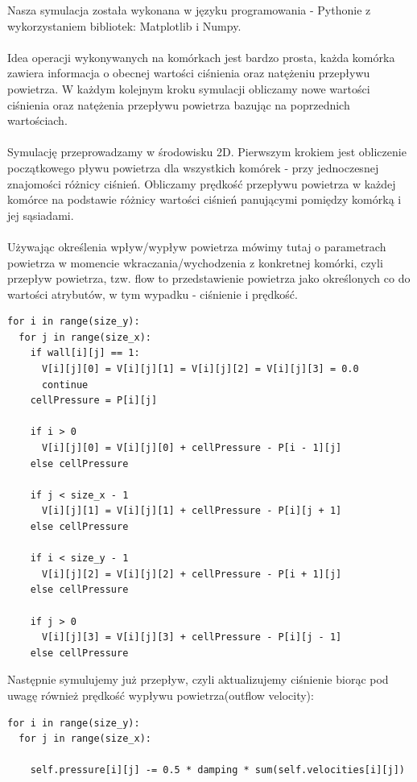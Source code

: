 \documentclass[a4paper, 12pt]{article}
\begin{document}
Nasza symulacja została wykonana w języku programowania - Pythonie z wykorzystaniem bibliotek: Matplotlib i Numpy. 
\\ \\
Idea operacji wykonywanych na komórkach jest bardzo prosta, każda komórka zawiera informacja o obecnej wartości ciśnienia oraz natężeniu przepływu powietrza. W każdym kolejnym kroku symulacji obliczamy nowe wartości ciśnienia oraz natężenia przepływu powietrza bazując na poprzednich wartościach.
\\ \\
Symulację przeprowadzamy w środowisku 2D. Pierwszym krokiem jest obliczenie początkowego pływu powietrza dla wszystkich komórek - przy jednoczesnej znajomości różnicy ciśnień. Obliczamy prędkość przepływu powietrza w każdej komórce na podstawie różnicy wartości ciśnień panującymi pomiędzy komórką i jej sąsiadami.
\\ \\
Używając określenia wpływ/wypływ powietrza mówimy tutaj o parametrach powietrza w momencie wkraczania/wychodzenia z konkretnej komórki, czyli przepływ powietrza, tzw. flow to przedstawienie powietrza jako określonych co do wartości atrybutów, w tym wypadku - ciśnienie i prędkość.

\begin{verbatim}
for i in range(size_y):
  for j in range(size_x):
    if wall[i][j] == 1:
      V[i][j][0] = V[i][j][1] = V[i][j][2] = V[i][j][3] = 0.0
      continue
    cellPressure = P[i][j]
		
    if i > 0 
      V[i][j][0] = V[i][j][0] + cellPressure - P[i - 1][j] 
    else cellPressure
		
    if j < size_x - 1 
      V[i][j][1] = V[i][j][1] + cellPressure - P[i][j + 1] 
    else cellPressure

    if i < size_y - 1 
      V[i][j][2] = V[i][j][2] + cellPressure - P[i + 1][j]
    else cellPressure
		
    if j > 0 
      V[i][j][3] = V[i][j][3] + cellPressure - P[i][j - 1]  
    else cellPressure
\end{verbatim}

Następnie symulujemy już przepływ, czyli aktualizujemy ciśnienie biorąc pod uwagę również prędkość wypływu powietrza(outflow velocity):

\begin{verbatim}
for i in range(size_y):
  for j in range(size_x):

    self.pressure[i][j] -= 0.5 * damping * sum(self.velocities[i][j])
\end{verbatim}
\end{document}
